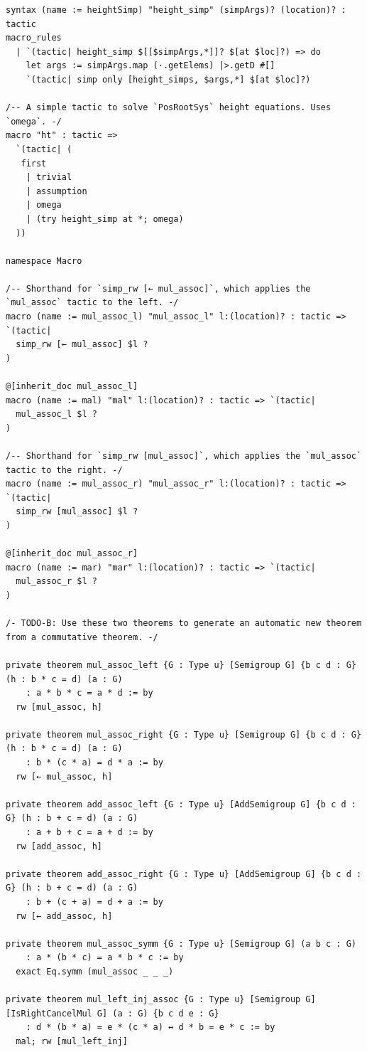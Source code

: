 \begin{Verbatim}
syntax (name := heightSimp) "height_simp" (simpArgs)? (location)? : tactic
macro_rules
  | `(tactic| height_simp $[[$simpArgs,*]]? $[at $loc]?) => do
    let args := simpArgs.map (·.getElems) |>.getD #[]
    `(tactic| simp only [height_simps, $args,*] $[at $loc]?)

/-- A simple tactic to solve `PosRootSys` height equations. Uses `omega`. -/
macro "ht" : tactic =>
  `(tactic| (
   first
    | trivial
    | assumption
    | omega
    | (try height_simp at *; omega)
  ))

namespace Macro

/-- Shorthand for `simp_rw [← mul_assoc]`, which applies the `mul_assoc` tactic to the left. -/
macro (name := mul_assoc_l) "mul_assoc_l" l:(location)? : tactic => `(tactic|
  simp_rw [← mul_assoc] $l ?
)

@[inherit_doc mul_assoc_l]
macro (name := mal) "mal" l:(location)? : tactic => `(tactic|
  mul_assoc_l $l ?
)

/-- Shorthand for `simp_rw [mul_assoc]`, which applies the `mul_assoc` tactic to the right. -/
macro (name := mul_assoc_r) "mul_assoc_r" l:(location)? : tactic => `(tactic|
  simp_rw [mul_assoc] $l ?
)

@[inherit_doc mul_assoc_r]
macro (name := mar) "mar" l:(location)? : tactic => `(tactic|
  mul_assoc_r $l ?
)

/- TODO-B: Use these two theorems to generate an automatic new theorem from a commutative theorem. -/

private theorem mul_assoc_left {G : Type u} [Semigroup G] {b c d : G} (h : b * c = d) (a : G)
    : a * b * c = a * d := by
  rw [mul_assoc, h]

private theorem mul_assoc_right {G : Type u} [Semigroup G] {b c d : G} (h : b * c = d) (a : G)
    : b * (c * a) = d * a := by
  rw [← mul_assoc, h]

private theorem add_assoc_left {G : Type u} [AddSemigroup G] {b c d : G} (h : b + c = d) (a : G)
    : a + b + c = a + d := by
  rw [add_assoc, h]

private theorem add_assoc_right {G : Type u} [AddSemigroup G] {b c d : G} (h : b + c = d) (a : G)
    : b + (c + a) = d + a := by
  rw [← add_assoc, h]

private theorem mul_assoc_symm {G : Type u} [Semigroup G] (a b c : G)
    : a * (b * c) = a * b * c := by
  exact Eq.symm (mul_assoc _ _ _)

private theorem mul_left_inj_assoc {G : Type u} [Semigroup G] [IsRightCancelMul G] (a : G) {b c d e : G}
    : d * (b * a) = e * (c * a) ↔ d * b = e * c := by
  mal; rw [mul_left_inj]


\end{Verbatim}
